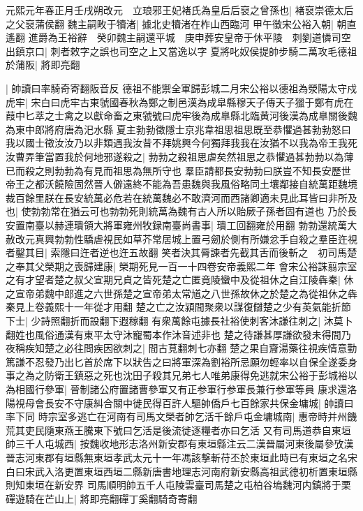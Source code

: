 元熙元年春正月壬戌朔改元　立琅邪王妃褚氏為皇后后裒之曾孫也|{
	褚裒崇德太后之父裒蒲侯翻}
魏主嗣畋于犢渚|{
	據北史犢渚在柞山西臨河}
甲午徵宋公裕入朝|{
	朝直遙翻}
進爵為王裕辭　癸卯魏主嗣還平城　庚申葬安皇帝于休平陵　刺劉道憐司空出鎮京口|{
	刺者敕字之誤也司空之上又當逸以字}
夏將叱奴侯提帥步騎二萬攻毛德祖於蒲阪|{
	將即亮翻}


|{
	帥讀曰率騎奇寄翻阪音反}
德祖不能禦全軍歸彭城二月宋公裕以德祖為滎陽太守戍虎牢|{
	宋白曰虎牢古東虢國春秋為鄭之制邑漢為成臯縣穆天子傳天子獵于鄭有虎在葭中匕萃之士禽之以獻命畜之東虢號曰虎牢後為成臯縣北臨黄河後漢為成臯關後魏為東中郎將府唐為汜水縣}
夏主勃勃徵隱士京兆韋祖思祖思既至恭懼過甚勃勃怒曰我以國士徵汝汝乃以非類遇我汝昔不拜姚興今何獨拜我我在汝猶不以我為帝王我死汝曹弄筆當置我於何地邪遂殺之|{
	勃勃之殺祖思虐矣然祖思之恭懼過甚勃勃以為薄已而殺之則勃勃為有見而祖思為無所守也}
羣臣請都長安勃勃曰朕豈不知長安歷世帝王之都沃饒險固然晉人僻遠終不能為吾患魏與我風俗略同土壤鄰接自統萬距魏境裁百餘里朕在長安統萬必危若在統萬魏必不敢濟河而西諸卿適未見此耳皆曰非所及也|{
	使勃勃常在猶云可也勃勃死則統萬為魏有古人所以貽厥子孫者固有道也}
乃於長安置南臺以赫連璝領大將軍雍州牧録南臺尚書事|{
	璝工回翻雍於用翻}
勃勃還統萬大赦改元真興勃勃性驕虐視民如草芥常居城上置弓劒於側有所嫌忿手自殺之羣臣迕視者鑿其目|{
	索隱曰迕者逆也迕五故翻}
笑者決其脣諫者先截其舌而後斬之　初司馬楚之奉其父榮期之喪歸建康|{
	榮期死見一百一十四卷安帝義熙二年}
會宋公裕誅翦宗室之有才望者楚之叔父宣期兄貞之皆死楚之亡匿竟陵蠻中及從祖休之自江陵犇秦|{
	休之宣帝弟魏中郎進之六世孫楚之宣帝弟太常馗之八世孫故休之於楚之為從祖休之犇秦見上卷義熙十一年從才用翻}
楚之亡之汝潁間聚衆以謀復讎楚之少有英氣能折節下士|{
	少詩照翻折而設翻下遐稼翻}
有衆萬餘屯據長社裕使刺客沐謙往刺之|{
	沐莫卜翻姓也風俗通漢有東平太守沐寵蜀本作沐音述非也}
楚之待謙甚厚謙欲發未得間乃夜稱疾知楚之必往問疾因欲刺之|{
	間古莧翻刺七亦翻}
楚之果自齎湯藥往視疾情意勤篤謙不忍發乃出匕首於席下以狀告之曰將軍深為劉裕所忌願勿輕率以自保全遂委身事之為之防衛王鎮惡之死也沈田子殺其兄弟七人唯弟康得免逃就宋公裕于彭城裕以為相國行參軍|{
	晉制諸公府置諸曹參軍又有正参軍行参軍長兼行参軍等員}
康求還洛陽視母會長安不守康糾合關中徙民得百許人驅帥僑戶七百餘家共保金墉城|{
	帥讀曰率下同}
時宗室多逃亡在河南有司馬文榮者帥乞活千餘戶屯金墉城南|{
	惠帝時并州饑荒其吏民隨東燕王騰東下號曰乞活是後流徙逐糧者亦曰乞活}
又有司馬道恭自東垣帥三千人屯城西|{
	按魏收地形志洛州新安郡有東垣縣注云二漢晉屬河東後屬參攷漢晉志河東郡有垣縣無東垣孝武太元十一年馮該撃斬苻丕於東垣此時已有東垣之名宋白曰宋武入洛更置東垣西垣二縣新唐書地理志河南府新安縣高祖武德初析置東垣縣則知東垣在新安界}
司馬順明帥五千人屯陵雲臺司馬楚之屯柏谷塢魏河内鎮將于栗磾遊騎在芒山上|{
	將即亮翻磾丁奚翻騎奇寄翻}
